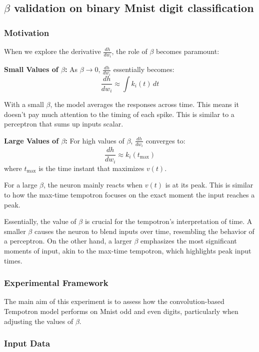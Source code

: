 \subsection{$\beta$ validation on binary Mnist digit classification}

\subsubsection{Motivation}

When we explore the derivative \(\frac{dh}{dw_i}\), the role of \(\beta\) becomes paramount:

\textbf{Small Values of \(\beta\):}
As \(\beta \to 0\), \(\frac{dh}{dw_i}\) essentially becomes:
\[ \frac{dh}{dw_i} \approx \int k_i(t) \, dt \]

With a small \(\beta\), the model averages the responses across time. This means it doesn't pay much attention to the timing of each spike. This is similar to a perceptron that sums up inputs scalar.

\textbf{Large Values of \(\beta\):}
For high values of \(\beta\), \(\frac{dh}{dw_i}\) converges to:
\[ \frac{dh}{dw_i} \approx k_i(t_{\text{max}}) \]
where \(t_{\text{max}}\) is the time instant that maximizes \(v(t)\).

For a large \(\beta\), the neuron mainly reacts when \(v(t)\) is at its peak. This is similar to how the max-time tempotron focuses on the exact moment the input reaches a peak.

Essentially, the value of \(\beta\) is crucial for the tempotron's interpretation of time. A smaller \(\beta\) causes the neuron to blend inputs over time, resembling the behavior of a perceptron. On the other hand, a larger \(\beta\) emphasizes the most significant moments of input, akin to the max-time tempotron, which highlights peak input times.

\subsubsection{Experimental Framework}

The main aim of this experiment is to assess how the convolution-based Tempotron model performs on Mnist odd and even digits, particularly when adjusting the values of $\beta$.

\subsubsection{Input Data}

